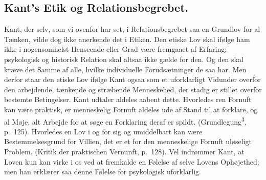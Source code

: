 \documentclass[12pt]{article}
\begin{document}
\subsection{Kant's Etik og Relationsbegrebet.}\label{sec:4e}
\noindent
Kant, der selv, som vi ovenfor har set, i Relationsbegrebet saa en
Grundlov for al Tænken, vilde dog ikke anerkende det i Etiken. Den
etiske Lov skal ifølge ham ikke i nogensomhelst Henseende eller Grad
være fremgaaet af Erfaring; psykologisk og historisk Relation skal
altsaa ikke gælde for den. Og den skal kræve det Samme af alle, hvilke
individuelle Forudsætninger de saa har. Men derfor staar den etiske
Lov ifølge Kant ogsaa som et uforklarligt Vidunder overfor den
arbejdende, tænkende og stræbende Menneskehed, der stadig er stillet
overfor bestemte Betingelser. Kant udtaler aldeles aabent dette.
\guillemotright Hvorledes ren Fornuft kan være praktisk, er menneskelig
Fornuft aldeles ude af Stand til at forklare, og al Møje, alt Arbejde
for at søge en Forklaring deraf er spildt\guillemotleft.
(Grundlegung\textsuperscript{3}, p.~125).
\guillemotright Hvorledes en Lov i og for sig og umiddelbart kan være
Bestemmelsesgrund for Villien, det er et for den menneskelige Fornuft
uløseligt Problem\guillemotleft. (Kritik der praktischen Vernunft,
p.~128).
Vel indrømmer Kant, at Loven kun kan virke i os ved at fremkalde en
Følelse af selve Lovens Ophøjethed; men han erklærer saa denne Følelse
for psykologisk uforklarlig.
\end{document}
